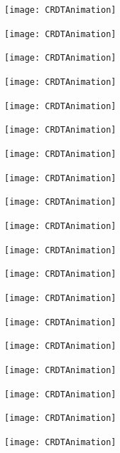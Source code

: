\documentclass{beamer}
\begin{document}
    \begin{frame}
        \texttt{[image: CRDTAnimation]}
    \end{frame}
    \begin{frame}
        \texttt{[image: CRDTAnimation]}
    \end{frame}
    \begin{frame}
        \texttt{[image: CRDTAnimation]}
    \end{frame}
    \begin{frame}
        \texttt{[image: CRDTAnimation]}
    \end{frame}
    \begin{frame}
        \texttt{[image: CRDTAnimation]}
    \end{frame}
    \begin{frame}
        \texttt{[image: CRDTAnimation]}
    \end{frame}
    \begin{frame}
        \texttt{[image: CRDTAnimation]}
    \end{frame}
    \begin{frame}
        \texttt{[image: CRDTAnimation]}
    \end{frame}
    \begin{frame}
        \texttt{[image: CRDTAnimation]}
    \end{frame}
    \begin{frame}
        \texttt{[image: CRDTAnimation]}
    \end{frame}
    \begin{frame}
        \texttt{[image: CRDTAnimation]}
    \end{frame}
    \begin{frame}
        \texttt{[image: CRDTAnimation]}
    \end{frame}
    \begin{frame}
        \texttt{[image: CRDTAnimation]}
    \end{frame}
    \begin{frame}
        \texttt{[image: CRDTAnimation]}
    \end{frame}
    \begin{frame}
        \texttt{[image: CRDTAnimation]}
    \end{frame}
    \begin{frame}
        \texttt{[image: CRDTAnimation]}
    \end{frame}
    \begin{frame}
        \texttt{[image: CRDTAnimation]}
    \end{frame}
    \begin{frame}
        \texttt{[image: CRDTAnimation]}
    \end{frame}
    \begin{frame}
        \texttt{[image: CRDTAnimation]}
    \end{frame}
\end{document}
